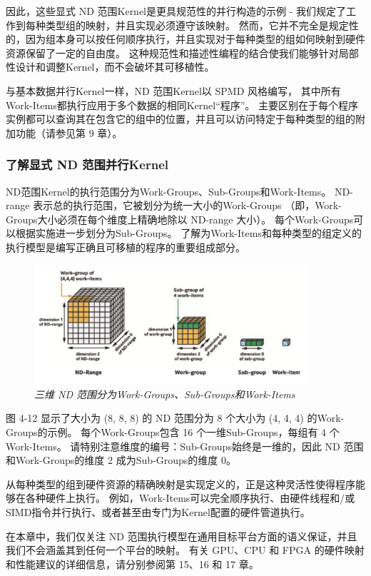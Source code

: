 因此，这些显式 ND 范围Kernel是更具规范性的并行构造的示例 - 我们规定了工作到每种类型组的映射，并且实现必须遵守该映射。 
然而，它并不完全是规定性的，因为组本身可以按任何顺序执行，并且实现对于每种类型的组如何映射到硬件资源保留了一定的自由度。 
这种规范性和描述性编程的结合使我们能够针对局部性设计和调整Kernel，而不会破坏其可移植性。

与基本数据并行Kernel一样，ND 范围Kernel以 SPMD 风格编写，
其中所有Work-Items都执行应用于多个数据的相同Kernel“程序”。 
主要区别在于每个程序实例都可以查询其在包含它的组中的位置，并且可以访问特定于每种类型的组的附加功能（请参见第 9 章）。

\subsubsection{了解显式 ND 范围并行Kernel}
ND范围Kernel的执行范围分为Work-Groups、Sub-Groups和Work-Items。 
ND-range 表示总的执行范围，它被划分为统一大小的Work-Groups
（即，Work-Groups大小必须在每个维度上精确地除以 ND-range 大小）。 
每个Work-Groups可以根据实施进一步划分为Sub-Groups。 
了解为Work-Items和每种类型的组定义的执行模型是编写正确且可移植的程序的重要组成部分。

\begin{figure}[H]
	\centering
	\includegraphics[width=0.9\textwidth]{figs/F4.12.png}
	\caption{\textit{三维 ND 范围分为Work-Groups、Sub-Groups和Work-Items}}
\end{figure}

图 4-12 显示了大小为 (8, 8, 8) 的 ND 范围分为 8 个大小为 (4, 4, 4) 的Work-Groups的示例。 
每个Work-Groups包含 16 个一维Sub-Groups，每组有 4 个Work-Items。 
请特别注意维度的编号：Sub-Groups始终是一维的，因此 ND 范围和Work-Groups的维度 2 成为Sub-Groups的维度 0。

从每种类型的组到硬件资源的精确映射是实现定义的，正是这种灵活性使得程序能够在各种硬件上执行。 
例如，Work-Items可以完全顺序执行、由硬件线程和/或SIMD指令并行执行、或者甚至由专门为Kernel配置的硬件管道执行。

在本章中，我们仅关注 ND 范围执行模型在通用目标平台方面的语义保证，并且我们不会涵盖其到任何一个平台的映射。 
有关 GPU、CPU 和 FPGA 的硬件映射和性能建议的详细信息，请分别参阅第 15、16 和 17 章。


